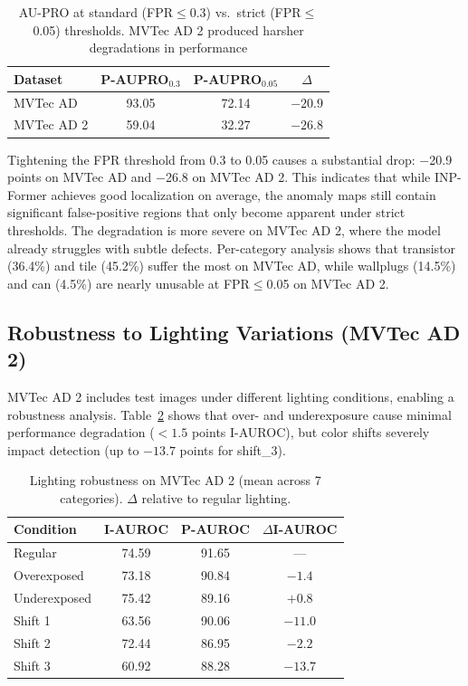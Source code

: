 \documentclass[10pt]{article} %
\begin{document}
\begin{table}[t]
\caption{AU-PRO at standard (FPR$\leq$0.3) vs.\ strict (FPR$\leq$0.05) thresholds. MVTec AD 2 produced harsher degradations in performance}
\label{tab:aupro_strict}
\begin{center}
\begin{tabular}{lccc}
\toprule
Dataset & P-AUPRO$_{0.3}$ & P-AUPRO$_{0.05}$ & $\Delta$ \\
\midrule
MVTec AD   & 93.05 & 72.14 & $-20.9$ \\
MVTec AD 2 & 59.04 & 32.27 & $-26.8$ \\
\bottomrule
\end{tabular}
\end{center}
\end{table}

Tightening the FPR threshold from 0.3 to 0.05 causes a substantial drop: $-$20.9 points on MVTec AD and $-$26.8 on MVTec AD 2. This indicates that while INP-Former achieves good localization on average, the anomaly maps still contain significant false-positive regions that only become apparent under strict thresholds. The degradation is more severe on MVTec AD 2, where the model already struggles with subtle defects. Per-category analysis shows that transistor (36.4\%) and tile (45.2\%) suffer the most on MVTec AD, while wallplugs (14.5\%) and can (4.5\%) are nearly unusable at FPR$\leq$0.05 on MVTec AD 2.


\subsection{Robustness to Lighting Variations (MVTec AD 2)}
\label{sec:lightshift}

MVTec AD 2 includes test images under different lighting conditions, enabling a robustness analysis. Table~\ref{tab:lightshift} shows that over- and underexposure cause minimal performance degradation ($<1.5$ points I-AUROC), but color shifts severely impact detection (up to $-13.7$ points for shift\_3).

\begin{table}[t]
\caption{Lighting robustness on MVTec AD 2 (mean across 7 categories). $\Delta$ relative to regular lighting.}
\label{tab:lightshift}
\begin{center}
\begin{tabular}{lccc}
\toprule
Condition & I-AUROC & P-AUROC & $\Delta$I-AUROC \\
\midrule
Regular & 74.59 & 91.65 & --- \\
Overexposed & 73.18 & 90.84 & $-1.4$ \\
Underexposed & 75.42 & 89.16 & $+0.8$ \\
Shift 1 & 63.56 & 90.06 & $-11.0$ \\
Shift 2 & 72.44 & 86.95 & $-2.2$ \\
Shift 3 & 60.92 & 88.28 & $-13.7$ \\
\bottomrule
\end{tabular}
\end{center}
\end{table}
\end{document}
